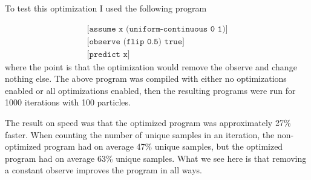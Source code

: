 \documentclass[a4paper]{article}
\begin{document}
To test this optimization I used the following program

\[
	\begin{array}{l}
		\texttt{[assume x (uniform-continuous 0 1)]} \\
		\texttt{[observe (flip 0.5) true]} \\
		\texttt{[predict x]}
	\end{array}
\]
where the point is that the optimization would remove the observe and change nothing else. The above program was compiled with either no optimizations enabled or all optimizations enabled, then the resulting programs were run for 1000 iterations with 100 particles.

The result on speed was that the optimized program was approximately 27\% faster. When counting the number of unique samples in an iteration, the non-optimized program had on average 47\% unique samples, but the optimized program had on average 63\% unique samples. What we see here is that removing a constant observe improves the program in all ways.



{}

\end{document}
